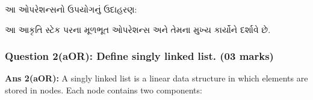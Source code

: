 આ ઓપરેશન્સનો ઉપયોગનું ઉદાહરણ:

\begin{Shaded}
\begin{Highlighting}[]
\OperatorTok{=} 
\OperatorTok{=}\NormalTok{ []}

\NormalTok{)}
\NormalTok{)}
\NormalTok{)}

\NormalTok{(}
\NormalTok{(}
\NormalTok{(}
\NormalTok{(}
\end{Highlighting}
\end{Shaded}

\begin{Shaded}
\begin{Highlighting}[]
\end{Highlighting}
\end{Shaded}

આ આકૃતિ સ્ટેક પરના મૂળભૂત ઓપરેશન્સ અને તેમના મુખ્ય કાર્યોને દર્શાવે છે.

\hypertarget{question-2aor-define-singly-linked-list.-03-marks}{%
\subsubsection{Question 2(aOR): Define singly linked list. (03
marks)}\label{question-2aor-define-singly-linked-list.-03-marks}}

\textbf{Ans 2(aOR):} A singly linked list is a linear data structure in
which elements are stored in nodes. Each node contains two components:


